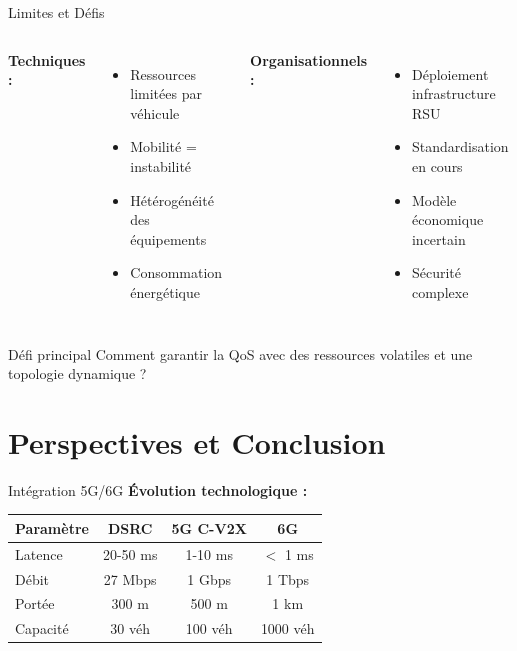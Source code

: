 ﻿\documentclass[aspectratio=169,11pt]{beamer}
\begin{document}
\begin{frame}{Limites et D\'efis}
\begin{columns}
\textbf{Techniques :}
\begin{itemize}
    \item[$\times$] Ressources limit\'ees par v\'ehicule
    \item[$\times$] Mobilit\'e = instabilit\'e
    \item[$\times$] H\'et\'erog\'en\'eit\'e des \'equipements
    \item[$\times$] Consommation \'energ\'etique
\end{itemize}

\textbf{Organisationnels :}
\begin{itemize}
    \item[$\times$] D\'eploiement infrastructure RSU
    \item[$\times$] Standardisation en cours
    \item[$\times$] Mod\`ele \'economique incertain
    \item[$\times$] S\'ecurit\'e complexe
\end{itemize}
\end{columns}

\vspace{0.5cm}
\begin{alertblock}{D\'efi principal}
Comment garantir la QoS avec des ressources volatiles et une topologie dynamique ?
\end{alertblock}
\end{frame}

\section{Perspectives et Conclusion}

\begin{frame}{Int\'egration 5G/6G}
\textbf{\'Evolution technologique :}

\begin{table}
\centering
\begin{tabular}{lccc}
\toprule
\textbf{Param\`etre} & \textbf{DSRC} & \textbf{5G C-V2X} & \textbf{6G} \\
\midrule
Latence & 20-50 ms & 1-10 ms & $<$ 1 ms \\
D\'ebit & 27 Mbps & 1 Gbps & 1 Tbps \\
Port\'ee & 300 m & 500 m & 1 km \\
Capacit\'e & 30 v\'eh & 100 v\'eh & 1000 v\'eh \\
\bottomrule
\end{tabular}
\end{table}

\vspace{0.3cm}
\end{frame}
\end{document}
